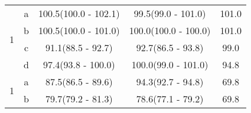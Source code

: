 \begin{table}[H]
\begin{tabular}{c|c|c|c|c}
\multirow{4}{*}{1} & a & 100.5(100.0 - 102.1) & 99.5(99.0 - 101.0) & 101.0\\ 
 & b & 100.5(100.0 - 101.0) & 100.0(100.0 - 100.0) & 101.0\\ 
 & c & 91.1(88.5 - 92.7) & 92.7(86.5 - 93.8) & 99.0\\ 
 & d & 97.4(93.8 - 100.0) & 100.0(99.0 - 101.0) & 94.8\\ 
\hline

\multirow{2}{*}{1} & a & 87.5(86.5 - 89.6) & 94.3(92.7 - 94.8) & 69.8\\ 
 & b & 79.7(79.2 - 81.3) & 78.6(77.1 - 79.2) & 69.8\\ 
\hline

		
		\hline




		\hline
		
	\end{tabular}
	\label{tab:resultsComplex}
\end{table}

